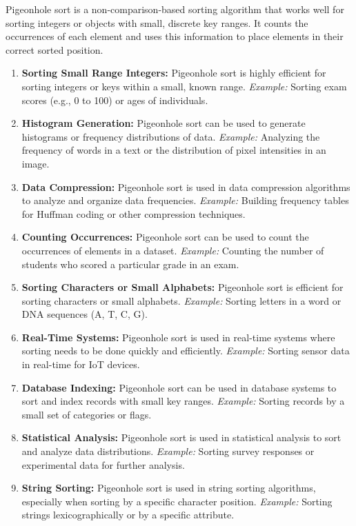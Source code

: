 Pigeonhole sort is a non-comparison-based sorting algorithm that works well for sorting integers or objects with small, discrete key ranges. It counts the occurrences of each element and uses this information to place elements in their correct sorted position.
\begin{enumerate}
    \item \textbf{Sorting Small Range Integers:} Pigeonhole sort is highly efficient for sorting integers or keys within a small, known range. \textit{Example:} Sorting exam scores (e.g., 0 to 100) or ages of individuals.
    \item \textbf{Histogram Generation:} Pigeonhole sort can be used to generate histograms or frequency distributions of data. \textit{Example:} Analyzing the frequency of words in a text or the distribution of pixel intensities in an image.
    \item \textbf{Data Compression:} Pigeonhole sort is used in data compression algorithms to analyze and organize data frequencies. \textit{Example:} Building frequency tables for Huffman coding or other compression techniques.
    \item \textbf{Counting Occurrences:} Pigeonhole sort can be used to count the occurrences of elements in a dataset. \textit{Example:} Counting the number of students who scored a particular grade in an exam.
    \item \textbf{Sorting Characters or Small Alphabets:} Pigeonhole sort is efficient for sorting characters or small alphabets. \textit{Example:} Sorting letters in a word or DNA sequences (A, T, C, G).
    \item \textbf{Real-Time Systems:} Pigeonhole sort is used in real-time systems where sorting needs to be done quickly and efficiently. \textit{Example:} Sorting sensor data in real-time for IoT devices.
    \item \textbf{Database Indexing:} Pigeonhole sort can be used in database systems to sort and index records with small key ranges. \textit{Example:} Sorting records by a small set of categories or flags.
    \item \textbf{Statistical Analysis:} Pigeonhole sort is used in statistical analysis to sort and analyze data distributions. \textit{Example:} Sorting survey responses or experimental data for further analysis.
    \item \textbf{String Sorting:} Pigeonhole sort is used in string sorting algorithms, especially when sorting by a specific character position. \textit{Example:} Sorting strings lexicographically or by a specific attribute.
\end{enumerate}


